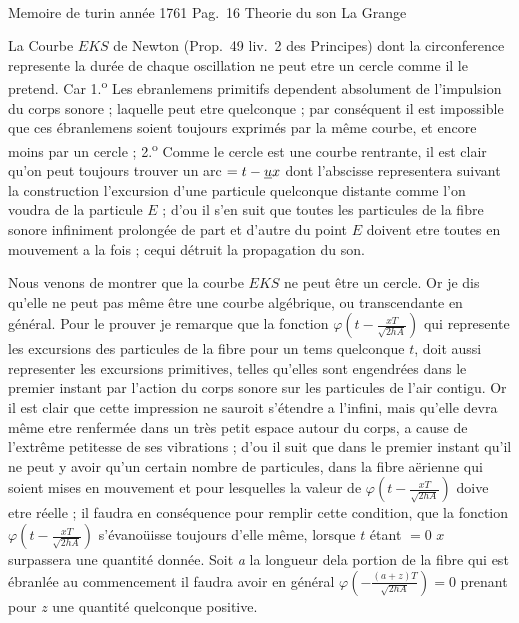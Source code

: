 \documentclass[11pt,a4paper]{article}
\begin{document}
Memoire de turin \textsuperscript{} année 1761 Pag.~16 Theorie du son La Grange

La Courbe $EKS$ de Newton (Prop.~49 liv.~2 des Principes) dont la circonference
represente la durée de chaque oscillation ne peut etre un cercle comme il
le pretend. Car 1.\textsuperscript{o} Les ebranlemens primitifs dependent absolument de
l'impulsion du corps sonore ; laquelle peut etre quelconque ; par conséquent
il est impossible que ces ébranlemens soient toujours exprimés par la même
courbe, et encore moins par un cercle ; 2.\textsuperscript{o} Comme le cercle est une courbe
rentrante, il est clair qu'on peut toujours trouver un arc $=t-\uncertain{u}x$ dont
l'abscisse representera  suivant la  construction l'excursion d'une
particule quelconque distante comme l'on voudra de la particule $E$ ;
d'ou il s'en suit que toutes les particules de la fibre sonore infiniment
prolongée de part et d'autre du point $E$ doivent etre toutes en mouvement
a la fois ; cequi détruit la propagation du son.

Nous venons de montrer que la courbe $EKS$ ne peut être un cercle.
Or je dis qu'elle ne peut pas même être une courbe algébrique, ou transcendante
en général. Pour le  prouver je remarque que la fonction $\varphi\left(t-\frac{xT}{\sqrt{2hA}}\right)$ qui represente
les excursions  des particules de la fibre pour un
tems quelconque $t$, doit aussi representer les excursions primitives, telles qu'elles
sont engendrées dans le premier instant par l'action du corps sonore sur les
particules de l'air contigu. Or il est clair que cette impression ne
sauroit s'étendre a l'infini, mais qu'elle devra même etre renfermée
dans un très petit espace autour du corps, a cause de l'extrême petitesse
de ses vibrations ; d'ou il suit que dans le premier instant qu'il ne
peut y avoir qu'un certain nombre de particules, dans la
fibre aërienne qui soient mises en mouvement et pour lesquelles
la valeur de $\varphi\left(t-\frac{xT}{\sqrt{2hA}}\right)$ doive etre réelle ; il faudra en conséquence
pour remplir cette condition, que la fonction $\varphi\left(t-\frac{xT}{\sqrt{2hA}}\right)$ s'évanoüisse
toujours d'elle même, lorsque  $t$ étant $=0$ $x$ surpassera une quantité
donnée. Soit \emph{a} la longueur dela portion de la fibre qui est ébranlée
au commencement il faudra avoir en général $\varphi\left(-\frac{(a+z)T}{\sqrt{2hA}}\right)=0$ prenant
pour $z$ une quantité quelconque positive.
\end{document}
